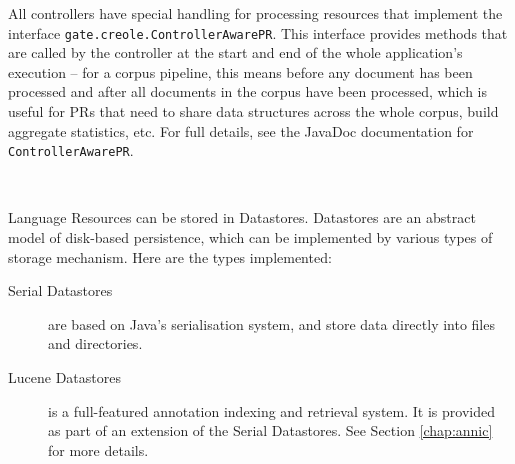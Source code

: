 All controllers have special handling for processing resources that implement
the interface \texttt{gate.creole.ControllerAwarePR}.  This interface provides
methods that are called by the controller at the start and end of the whole
application's execution -- for a corpus pipeline, this means before any
document has been processed and after all documents in the corpus have been
processed, which is useful for PRs that need to share data structures across
the whole corpus, build aggregate statistics, etc.  For full details, see the
JavaDoc documentation for \texttt{ControllerAwarePR}.
%



\mbox{ }

Language Resources can be stored in Datastores. Datastores are an abstract
model of disk-based persistence, which can be implemented by various types of
storage mechanism. Here are the types implemented:
%
\begin{description}
%
\item[Serial Datastores] are based on Java's serialisation system, and store
data directly into files and directories.
%
\item[Lucene Datastores] is a full-featured annotation indexing and
retrieval system. It is provided as part of an extension of the Serial
Datastores. See Section \ref{chap:annic} for more details.
%
%
\end{description}


\mbox{ }

